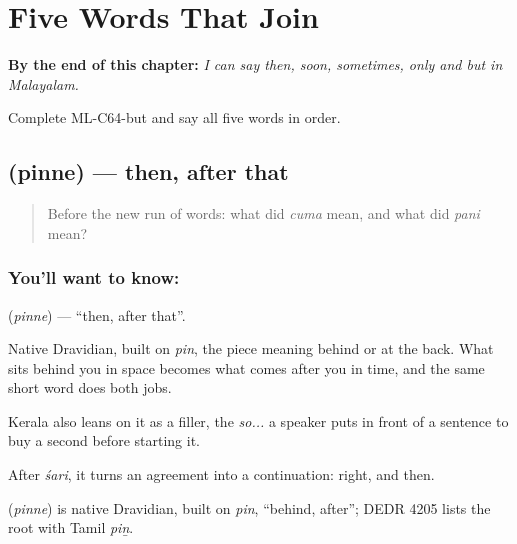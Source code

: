 
\chapter{Five Words That Join}
\label{ch:ml-five-words-that-join}

\begin{chapteropening}
\textbf{By the end of this chapter:} \emph{I can say then, soon, sometimes, only and but in Malayalam.}

Complete ML-C64-but and say all five words in order.
\end{chapteropening}

\section[\texorpdfstring{\ml{പിന്നെ} (pinne)}{പിന്നെ (pinne)}]{ (pinne) — then, after that}

\label{lesson:ML-C64-then}



\begin{quote}
Before the new run of words: what did \emph{cuma} mean, and what did \emph{pani} mean?
\end{quote}

\subsection*{You'll want to know: }
\textbf{} (\emph{pinne}) — \textquotedblleft{}then, after that\textquotedblright{}.

Native Dravidian, built on \emph{pin}, the piece meaning behind or at the back. What sits behind you in space becomes what comes after you in time, and the same short word does both jobs.

Kerala also leans on it as a filler, the \emph{so...} a speaker puts in front of a sentence to buy a second before starting it.

After \emph{śari}, it turns an agreement into a continuation: right, and then.

\begin{cousinweb}
\textbf{} (\emph{pinne}) is native Dravidian, built on \emph{pin}, \textquotedblleft{}behind, after\textquotedblright{}; DEDR 4205 lists the root with Tamil \emph{piṉ}.
\end{cousinweb}


